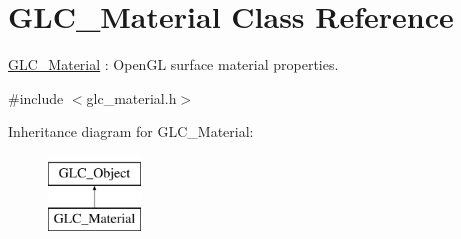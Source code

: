 \hypertarget{class_g_l_c___material}{\section{G\-L\-C\-\_\-\-Material Class Reference}
\label{class_g_l_c___material}
}


\hyperlink{class_g_l_c___material}{G\-L\-C\-\_\-\-Material} \-: Open\-G\-L surface material properties.  




{\ttfamily \#include $<$glc\-\_\-material.\-h$>$}

Inheritance diagram for G\-L\-C\-\_\-\-Material\-:\begin{figure}[H]
\begin{center}
\leavevmode
\includegraphics[height=2.000000cm]{class_g_l_c___material}
\end{center}
\end{figure}
